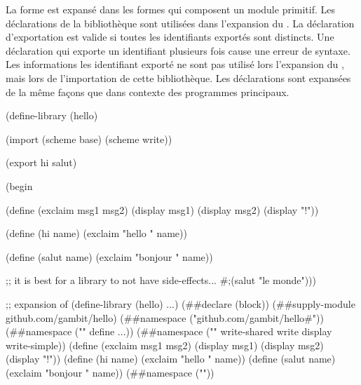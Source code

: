La forme  est expansé dans les formes qui composent un
module primitif. Les déclarations de la bibliothèque sont utilisées dans
l'expansion du . La déclaration d'exportation est
valide si toutes les identifiants exportés sont distincts.  Une déclaration
 qui exporte un identifiant plusieurs fois cause une erreur de
syntaxe. Les informations les identifiant exporté ne sont pas utilisé lors
l'expansion du , mais lors de l'importation de cette
bibliothèque.  Les déclarations  sont expansées de la même
façons que dans contexte des programmes principaux.\\

\begin{center}
\begin{mplisting}{0.9}
(define-library (hello)

  (import (scheme base) (scheme write))

  (export hi salut)

  (begin

    (define (exclaim msg1 msg2)
      (display msg1)
      (display msg2)
      (display "!\n"))

    (define (hi name) (exclaim "hello " name))

    (define (salut name) (exclaim "bonjour " name))

    ;; it is best for a library to not have side-effects...
    #;(salut "le monde")))
\end{mplisting}
\end{center}

\begin{center}
  \begin{mplisting}{0.9}
;; expansion of (define-library (hello) ...)
(##declare (block))
(##supply-module github.com/gambit/hello)
(##namespace ("github.com/gambit/hello#"))
(##namespace ("" define ...))
(##namespace ("" write-shared write display write-simple))
(define (exclaim msg1 msg2)
    (display msg1) (display msg2) (display "!\n"))
(define (hi name) (exclaim "hello " name))
(define (salut name) (exclaim "bonjour " name))
(##namespace (""))
\end{mplisting}
\end{center}

